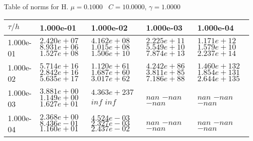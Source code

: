 \begin{center}
Table of norms for H. $\mu = 0.1000$ \, $C = 10.0000$, $\gamma = 1.0000$
  
\begin{tabular}{|p{1in}|p{1in}|p{1in}|p{1in}|p{1in}|} \hline
$\tau / h$ &1.000e-01 &1.000e-02 &1.000e-03 &1.000e-04 \\ \hline 
1.000e-01 & $2.420e+07$  $8.931e+06$  $1.527e+08$  & $4.162e+08$  $1.015e+08$  $1.506e+10$  & $2.225e+11$  $5.549e+10$  $7.874e+13$  & $1.171e+12$  $1.579e+10$  $2.237e+14$  \\ \hline 
1.000e-02 & $5.714e+16$  $2.842e+16$  $5.635e+17$  & $1.120e+61$  $1.687e+60$  $3.017e+62$  & $4.242e+86$  $3.811e+85$  $7.186e+88$  & $1.460e+132$  $1.854e+131$  $2.644e+135$  \\ \hline 
1.000e-03 & $3.881e+00$  $1.149e+00$  $1.627e+01$  & $4.363e+237$  $inf$  $inf$  & $nan$  $-nan$  $-nan$  & $nan$  $-nan$  $-nan$  \\ \hline 
1.000e-04 & $2.368e+00$  $8.436e-01$  $1.160e+01$  & $4.524e-03$  $2.327e-03$  $2.437e-02$  & $nan$  $-nan$  $-nan$  & $nan$  $-nan$  $-nan$  \\ \hline 

\end{tabular}\\[20pt]
\end{center}
